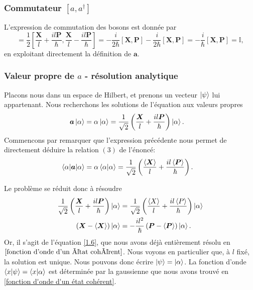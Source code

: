 \documentclass[11pt,oneside,a4paper]{article}
\newcommand{\h}{\ensuremath{\hbar}}
\begin{document}
\subsubsection{Commutateur $[a,a^\dagger]$}
L'expression de commutation des bosons est donnée par
\begin{equation}
    [\bm{a},\bm{a}^\dagger] = \frac{1}{2} [\frac{\bm{X}}{l}+\frac{il\bm{P}}{\hbar},\frac{\bm{X}}{l}-\frac{il\bm{P}}{\hbar}] = -\frac{i}{2\h} [\bm{X},\bm{P}]-\frac{i}{2\h}[\bm{X},\bm{P}] = -\frac{i}{\h}[\bm{X},\bm{P}] = \mathbb{I},
\end{equation}
en exploitant directement la définition de $\bm{a}$.

\subsubsection{Valeur propre de $a$ - résolution analytique}
\label{resolution analytique}

Placons nous dans un espace de Hilbert, et prenons un vecteur $\ket{\psi}$ lui appartenant. Nous recherchons les solutions de l'équation aux valeurs propres
\begin{align}
  \bm{a}\ket{\alpha} &= \alpha\ket{\alpha} = \frac{1}{\sqrt{2}}\left(\frac{\bm{X}}{l}+\frac{il\bm{P}}{\h}\right)\ket{\alpha}.
\end{align}
Commencons par remarquer que l'expression précédente nous permet de directement déduire la relation $(3)$ de l'énoncé:
\begin{align}
  \expval{\bm{a}}{\alpha} &= \alpha\braket{\alpha} = \frac{1}{\sqrt{2}}\left(\frac{\expval{\bm{X}}}{l}+\frac{il\expval{\bm{P}}}{\h}\right).
\end{align}

Le problème se réduit donc à résoudre
\begin{align}
  \frac{1}{\sqrt{2}}\left(\frac{\bm{X}}{l}+\frac{il\bm{P}}{\h}\right)\ket{\alpha} &= \frac{1}{\sqrt{2}}\left(\frac{\expval{X}}{l}+\frac{il\expval{P}}{\h}\right)\ket{\alpha}\\
  \left(\bm{X}-\expval{\bm{X}}\right)\ket{\alpha} &= -\frac{il^2}{\h}\left(\bm{P}-\expval{\bm{P}}\right)\ket{\alpha}.
\end{align}
Or, il s'agit de l'équation \eqref{1.6}, que nous avons déjà entièrement résolu en $\ref{fonction d'onde d'un état cohérent}$. Nous voyons en particulier que, à $l$ fixé, la solution est unique. Nous pouvons donc écrire $\ket{\psi} = \ket{\alpha}$. La fonction d'onde $\braket{x}{\psi}=\braket{x}{\alpha}$ est déterminée par la gaussienne que nous avons trouvé en \ref{fonction d'onde d'un état cohérent}.\\
\end{document}
